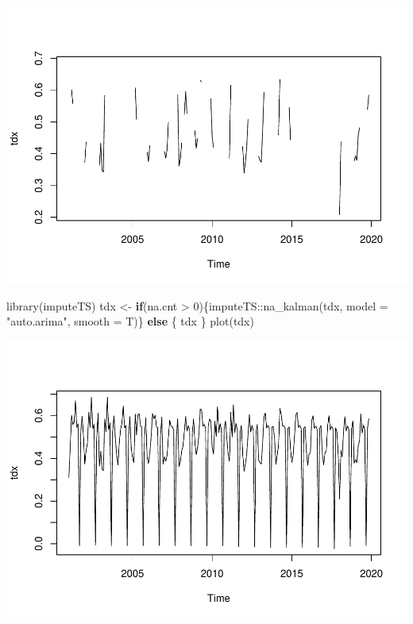 \documentclass[10pt]{report}
\newenvironment{Shaded}{\begin{snugshade}}{\end{snugshade}}
\newcommand{\AttributeTok}[1]{\textcolor[rgb]{0.77,0.63,0.00}{#1}}
\newcommand{\ControlFlowTok}[1]{\textcolor[rgb]{0.13,0.29,0.53}{\textbf{#1}}}
\newcommand{\DecValTok}[1]{\textcolor[rgb]{0.00,0.00,0.81}{#1}}
\newcommand{\FunctionTok}[1]{\textcolor[rgb]{0.00,0.00,0.00}{#1}}
\newcommand{\NormalTok}[1]{#1}
\newcommand{\OtherTok}[1]{\textcolor[rgb]{0.56,0.35,0.01}{#1}}
\newcommand{\SpecialCharTok}[1]{\textcolor[rgb]{0.00,0.00,0.00}{#1}}
\newcommand{\StringTok}[1]{\textcolor[rgb]{0.31,0.60,0.02}{#1}}
\begin{document}
\includegraphics{unnamed-chunk-13-1.pdf}

\begin{Shaded}
\begin{Highlighting}[]
\FunctionTok{library}\NormalTok{(imputeTS)}
\NormalTok{tdx }\OtherTok{\textless{}{-}} \ControlFlowTok{if}\NormalTok{(na.cnt }\SpecialCharTok{\textgreater{}} \DecValTok{0}\NormalTok{)\{imputeTS}\SpecialCharTok{::}\FunctionTok{na\_kalman}\NormalTok{(tdx, }\AttributeTok{model =} \StringTok{"auto.arima"}\NormalTok{, }\AttributeTok{smooth =}\NormalTok{ T)\} }\ControlFlowTok{else}\NormalTok{ \{}
\NormalTok{    tdx}
\NormalTok{\}}
\FunctionTok{plot}\NormalTok{(tdx)}
\end{Highlighting}
\end{Shaded}

\includegraphics{unnamed-chunk-14-1.pdf}
\end{document}
